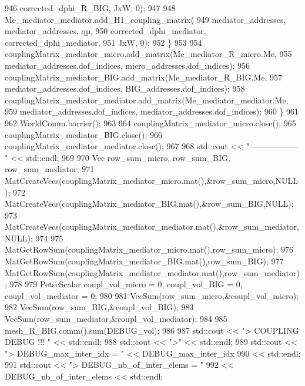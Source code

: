 \begin{DoxyCode}
946                             corrected\_dphi\_R\_BIG, JxW, 0);
947 
948                     Me\_mediator\_mediator.add\_H1\_coupling\_matrix(
949                             mediator\_addresses, mediator\_addresses, qp,
950                             corrected\_dphi\_mediator, corrected\_dphi\_mediator,
951                             JxW, 0);
952             \}
953 
954             couplingMatrix\_mediator\_micro.add\_matrix(Me\_mediator\_R\_micro.Me,
955                     mediator\_addresses.dof\_indices, micro\_addresses.dof\_indices);
956             couplingMatrix\_mediator\_BIG.add\_matrix(Me\_mediator\_R\_BIG.Me,
957                     mediator\_addresses.dof\_indices, BIG\_addresses.dof\_indices);
958             couplingMatrix\_mediator\_mediator.add\_matrix(Me\_mediator\_mediator.Me,
959                     mediator\_addresses.dof\_indices, mediator\_addresses.dof\_indices);
960         \}
961 
962         WorldComm.barrier();
963 
964         couplingMatrix\_mediator\_micro.close();
965         couplingMatrix\_mediator\_BIG.close();
966         couplingMatrix\_mediator\_mediator.close();
967 
968         std::cout << \textcolor{stringliteral}{" ----------------- "} << std::endl;
969 
970         Vec row\_sum\_micro, row\_sum\_BIG, row\_sum\_mediator;
971         MatCreateVecs(couplingMatrix\_mediator\_micro.mat(),&row\_sum\_micro,NULL);
972         MatCreateVecs(couplingMatrix\_mediator\_BIG.mat(),&row\_sum\_BIG,NULL);
973         MatCreateVecs(couplingMatrix\_mediator\_mediator.mat(),&row\_sum\_mediator,NULL);
974 
975         MatGetRowSum(couplingMatrix\_mediator\_micro.mat(),row\_sum\_micro);
976         MatGetRowSum(couplingMatrix\_mediator\_BIG.mat(),row\_sum\_BIG);
977         MatGetRowSum(couplingMatrix\_mediator\_mediator.mat(),row\_sum\_mediator);
978 
979         PetscScalar coupl\_vol\_micro = 0, coupl\_vol\_BIG = 0, coupl\_vol\_mediator = 0;
980 
981         VecSum(row\_sum\_micro,&coupl\_vol\_micro);
982         VecSum(row\_sum\_BIG,&coupl\_vol\_BIG);
983         VecSum(row\_sum\_mediator,&coupl\_vol\_mediator);
984 
985         mesh\_R\_BIG.comm().sum(DEBUG\_vol);
986 
987             std::cout << \textcolor{stringliteral}{"> COUPLING DEBUG !!! "} << std::endl;
988             std::cout << \textcolor{stringliteral}{">"} << std::endl;
989             std::cout << \textcolor{stringliteral}{">    DEBUG\_max\_inter\_idx     = "} << DEBUG\_max\_inter\_idx
990                     << std::endl;
991             std::cout << \textcolor{stringliteral}{">    DEBUG\_nb\_of\_inter\_elems = "}
992                     << DEBUG\_nb\_of\_inter\_elems << std::endl;

\end{DoxyCode}
